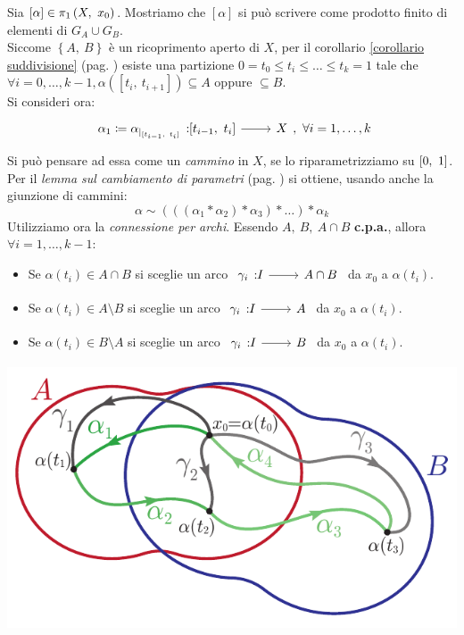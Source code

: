 \begin{demonstration} 
	Sia $[\alpha]\in\gruf{X}{x_0}$. Mostriamo che $[\alpha]$ si può scrivere come prodotto finito di elementi di $G_A\cup G_B$.\\
	Siccome $\left\{A,\ B\right\}$ è un ricoprimento aperto di $X$, per il corollario \ref{corollario suddivisione} (pag. \pageref{corollario suddivisione}) esiste una partizione $0=t_0\leq t_i\leq\dots\leq t_k=1$ tale che $\forall i=0,\dots,k-1, \alpha([t_i,\ t_{i+1}]) \subseteq A$ oppure $\subseteq B$. \\ 
	Si consideri ora:
	\begin{equation*}
		\funz {\alpha_1\coloneqq \alpha_{\mid_{[t_{i-1},\ t_i]}}} {[t_{i-1},\ t_i]} X,\ \forall i=1,\dots,k
	\end{equation*}
	Si può pensare ad essa come un \textit{cammino} in $X$, se lo riparametrizziamo su $\left[0,\ 1\right]$. Per il \textit{lemma  sul cambiamento di parametri} (pag. \pageref{cambiamentodiparametri}) si ottiene, usando anche la giunzione di cammini:
	\begin{equation*}
		\alpha\sim \left( \left( (\alpha_1 \ast \alpha_2)\ast \alpha_3 \right)\ast \ldots\right) \ast \alpha_k
	\end{equation*}
	Utilizziamo ora la \textit{connessione per archi}. Essendo $A,\ B,\ A\cap B$ \textbf{c.p.a.}, allora $\forall i=1,\dots,k-1$:
		\begin{itemize}
			\item Se $\alpha(t_i)\in A\cap B$ si sceglie un arco $\funz {\gamma_i} I {A\cap B}$ da $x_0$ a $\alpha(t_i)$.
			\item Se $\alpha(t_i)\in A\setminus B$ si sceglie un arco $\funz {\gamma_i} I {A}$ da $x_0$ a $\alpha(t_i)$.
			\item Se $\alpha(t_i)\in B\setminus A$ si sceglie un arco $\funz {\gamma_i} I {B}$ da $x_0$ a $\alpha(t_i)$.
		\end{itemize}
		\begin{center}
		\includegraphics[trim=0cm 0cm 0cm 0cm,clip,scale=0.8]{images/vankampenpaths.pdf}

\end{center}
\end{demonstration}
